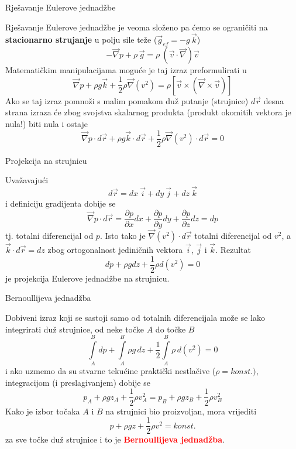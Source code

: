 \documentclass[croatian]{beamer}
\begin{document}
\begin{frame}{Rješavanje Eulerove jednadžbe}

Rješavanje Eulerove jednadžbe je veoma složeno pa ćemo se ograničiti
na \textbf{stacionarno strujanje }u polju sile teže ($\vec{g}_{ef}=-g\,\vec{k}$)
\[
-\vec{\nabla}p+\rho\,\vec{g}=\rho\:(\vec{v}\cdot\vec{\nabla})\vec{v}
\]
Matematičkim manipulacijama moguće je taj izraz preformulirati u
\[
\vec{\nabla}p+\rho g\vec{k}+\frac{1}{2}\rho\vec{\nabla}(v^{2})=\rho[\vec{v}\times(\vec{\nabla}\times\vec{v})]
\]
Ako se taj izraz pomnoži s malim pomakom duž putanje (strujnice) $d\vec{r}$
desna strana izraza će zbog svojstva skalarnog produkta (produkt okomitih
vektora je nula!) biti nula i ostaje 
\[
\vec{\nabla}p\cdot d\vec{r}+\rho g\vec{k}\cdot d\vec{r}+\frac{1}{2}\rho\vec{\nabla}(v^{2})\cdot d\vec{r}=0
\]
\end{frame}

\begin{frame}{Projekcija na strujnicu}

Uvažavajući 
\[
d\vec{r}=dx\:\vec{i}+dy\:\vec{j}+dz\:\vec{k}
\]
i definiciju gradijenta dobije se 
\[
\vec{\nabla}p\cdot d\vec{r}=\frac{\partial p}{\partial x}dx+\frac{\partial p}{\partial y}dy+\frac{\partial p}{\partial z}dz=dp
\]
tj. totalni diferencijal od $p$. Isto tako je $\vec{\nabla}(v^{2})\cdot d\vec{r}$
totalni diferencijal od $v^{2}$, a $\vec{k}\cdot d\vec{r}=dz$ zbog
ortogonalnost jediničnih vektora $\vec{i}$, $\vec{j}$ i $\vec{k}$.
Rezultat 
\[
dp+\rho gdz+\frac{1}{2}\rho d(v^{2})=0
\]
je projekcija Eulerove jednadžbe na strujnicu.
\end{frame}

\begin{frame}{Bernoullijeva jednadžba}

Dobiveni izraz koji se sastoji samo od totalnih diferencijala može
se lako integrirati duž strujnice, od neke točke $A$ do točke $B$
\[
\int\limits _{A}^{B}dp+\int\limits _{A}^{B}\rho g\,dz+\frac{1}{2}\int\limits _{A}^{B}\rho\,d(v^{2})=0
\]
i ako uzmemo da su stvarne tekućine praktički nestlačive ($\rho=konst.)$,
integracijom (i preslagivanjem) dobije se 
\[
p_{{\scriptscriptstyle A}}+\rho gz_{{\scriptscriptstyle A}}+\frac{1}{2}\rho v_{{\scriptscriptstyle A}}^{2}=p_{{\scriptscriptstyle B}}+\rho gz_{{\scriptscriptstyle B}}+\frac{1}{2}\rho v_{{\scriptscriptstyle B}}^{2}
\]
Kako je izbor točaka $A$ i $B$ na strujnici bio proizvoljan, mora
vrijediti 
\[
p+\rho gz+\frac{1}{2}\rho v^{2}=konst.
\]
za sve točke duž strujnice i to je \textbf{\textcolor{red}{Bernoullijeva
jednadžba}}.
\end{frame}
\end{document}
